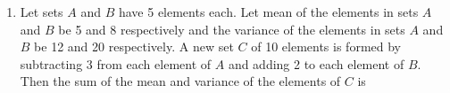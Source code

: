 \documentclass[journal,,12pt,onecolumn]{IEEEtran}
\theoremstyle{remark}
\begin{document}
\begin{enumerate}
\begin{enumerate}
\begin{multicols}{4}
    \end{multicols}
        \end{enumerate}
\bigskip
\item Let sets $A$ and $B$ have 5 elements each. Let mean of the elements in sets $A$ and $B$ be 5 and 8 respectively and the variance of the elements in sets $A$ and $B$ be 12 and 20 respectively. A new set $C$ of 10 elements is formed by subtracting 3 from each element of $A$ and adding 2 to each element of $B$. Then the sum of the mean and variance of the elements of $C$ is
 \begin{enumerate}
        \end{enumerate}
\bigskip



\end{enumerate}
\end{document}
